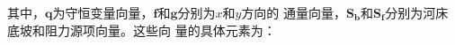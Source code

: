                                                         其中，$\mathbf{q}$为守恒变量向量，$\mathbf{f}$和$\mathbf{g}$分别为$x$和$y$方向的
                                                        通量向量，$\mathbf{S_{b}}$和$\mathbf{S_{f}}$分别为河床底坡和阻力源项向量。这些向
                                                        量的具体元素为：
